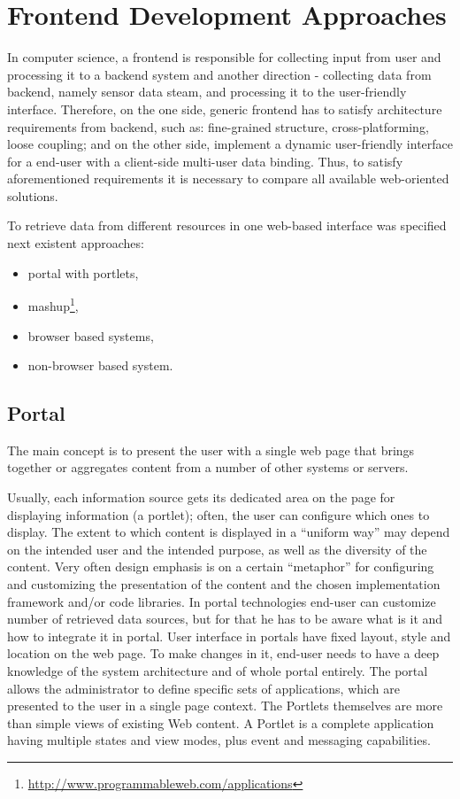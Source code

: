 \section{Frontend Development Approaches}
In computer science, a frontend is responsible for collecting input from user and processing it to a backend system and another direction - collecting data from backend, namely sensor data steam, and processing it to the user-friendly interface. Therefore, on the one side, generic frontend has to satisfy architecture requirements from backend, such as: fine-grained structure, cross-platforming, loose coupling; and on the other side, implement a dynamic user-friendly interface for a end-user with a client-side multi-user data binding. Thus, to satisfy aforementioned requirements it is necessary to compare all available web-oriented solutions.

To retrieve data from different resources in one web-based interface was specified next existent approaches:
\begin{itemize}
 \item portal with portlets,
 \item mashup\footnote{\url{http://www.programmableweb.com/applications}},
 \item browser based systems,
 \item non-browser based system.
\end{itemize}

	\subsection{Portal}
	The main concept is to present the user with a single web page that brings together or aggregates content from a number of other systems or servers. 

	Usually, each information source gets its dedicated area on the page for displaying information (a portlet); often, the user can configure which ones to display. The extent to which content is displayed in a ``uniform way'' may depend on the intended user and the intended purpose, as well as the diversity of the content. Very often design emphasis is on a certain ``metaphor'' for configuring and customizing the presentation of the content and the chosen implementation framework and/or code libraries\cite{pautasso2008restful,seong2006usability}. In portal technologies end-user can customize number of retrieved data sources, but for that he has to be aware what is it and how to integrate it in portal. User interface in portals have fixed layout, style and location on the web page. To make changes in it, end-user needs to have a deep knowledge of the system architecture and of whole portal entirely. The portal allows the administrator to define specific sets of applications, which are presented to the user in a single page context. The Portlets themselves are more than simple views of existing Web content. A Portlet is a complete application having multiple states and view modes, plus event and messaging capabilities.

